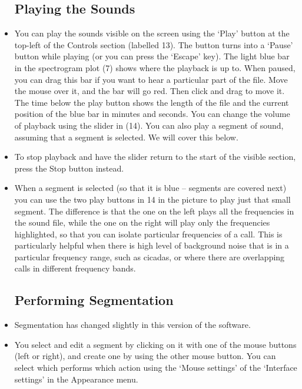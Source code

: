 \documentclass{article}
\begin{document}
\begin{itemize}
\subsection{Playing the Sounds}

\item You can play the sounds visible on the screen using the `Play' button at the top-left of the Controls section (labelled 13). The button turns into a `Pause' button while playing (or you can press the `Escape' key). The light blue bar in the spectrogram plot (7)  shows where the playback is up to. When paused, you can drag this bar if you want to hear a particular part of the file. Move the mouse over it, and the bar will go red. Then click and drag to move it. The time below the play button shows the length of the file and the current position of the blue bar in minutes and seconds. You can change the volume of playback using the slider in (14). 
You can also play a segment of sound, assuming that a segment is selected. We will cover this below.

\item To stop playback and have the slider return to the start of the visible section, press the Stop button instead.

\item When a segment is selected (so that it is blue -- segments are covered next) you can use the two play buttons in 14 in the picture to play just that small segment. The difference is that the one on the left plays all the frequencies in the sound file, while the one on the right will play only the frequencies highlighted, so that you can isolate particular frequencies of a call. This is particularly helpful when there is high level of background noise that is in a particular frequency range, such as cicadas, or where there are overlapping calls in different frequency bands.

\subsection{Performing Segmentation}

\item Segmentation has changed slightly in this version of the software. 

\item You select and edit a segment by clicking on it with one of the mouse buttons (left or right), and create one by using the other mouse button. You can select which performs which action using the `Mouse settings' of the `Interface settings' in the Appearance menu.


\end{itemize}
\end{document}
